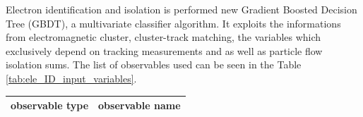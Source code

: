 
Electron identification and isolation is performed new Gradient Boosted Decision Tree (GBDT), a multivariate classifier algorithm. 
It exploits the informations from electromagnetic cluster, cluster-track matching, the variables which  exclusively depend on tracking measurements and as well as particle flow isolation sums. The list of observables used can be seen in the Table \ref{tab:ele_ID_input_variables}.

 \begin{table}[h!]
\scriptsize
    \centering
    \begin{tabular}{c|l}
\hline %
\hline %
observable type    &  observable name      	\\
\hline %


\end{tabular}
\end{table}
